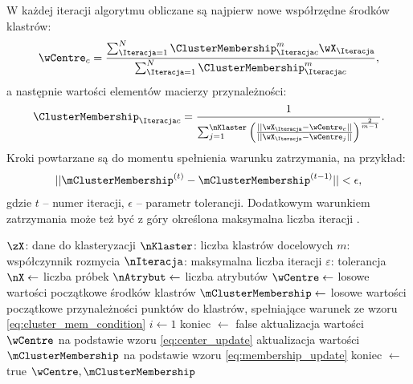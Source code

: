 \documentclass[a4paper,twoside,12pt]{book}
\begin{document}
W każdej iteracji algorytmu obliczane są najpierw nowe współrzędne środków klastrów:
\begin{align}
	\label{eq:center_update}
	\wCentre_{\klaster} = \frac{\sum_{\Iteracja=1}^{N} \ClusterMembership_{\Iteracja\klaster}^{m} \wX_{\Iteracja}}{\sum_{\Iteracja=1}^{N} \ClusterMembership_{\Iteracja\klaster}^{m}},
\end{align}
a następnie wartości elementów macierzy przynależności:
\begin{align}
	\label{eq:membership_update}
	\ClusterMembership_{\Iteracja\klaster} = \frac{1}{\sum_{j=1}^{\nKlaster}\left( \frac{||\wX_{\Iteracja} - \wCentre_{\klaster}||}{||\wX_{\Iteracja} - \wCentre_{j}||} \right)^{\frac{2}{m - 1}}}.
\end{align}
Kroki powtarzane są do momentu spełnienia warunku zatrzymania, na przykład:
\begin{align}
	\label{eq:fcm_stop_contidion}
	||\mClusterMembership^{(t)} - \mClusterMembership^{(t-1)}|| < \epsilon,
\end{align}
%
gdzie $t$ -- numer iteracji, $\epsilon$ -- parametr tolerancji. Dodatkowym warunkiem zatrzymania może też być z góry określona maksymalna liczba iteracji \cite{bib:scikit-fuzzy-cmeans-docs-fcm, bib:skfuzzy-docs-fcm}.

\begin{algorithm}[t]
	\caption{Algorytm rozmytych $c$ średnich}
	\label{alg:fcm}
	\begin{algorithmic}[1]
		\Require $\zX$: dane do klasteryzacji
		\Require $\nKlaster$: liczba klastrów docelowych
		\Require $m$: współczynnik rozmycia 
		\Require $\nIteracja$: maksymalna liczba iteracji
		\Require $\varepsilon$: tolerancja
		\State $\nX \gets $ liczba próbek
		\State $\nAtrybut \gets $ liczba atrybutów  
		\State $\wCentre \gets $ losowe wartości początkowe środków klastrów
		\State $\mClusterMembership \gets $ losowe wartości początkowe przynależności punktów do klastrów, spełniające warunek ze wzoru \ref{eq:cluster_mem_condition}
		\State $i\gets 1$
		\State koniec $\gets$ false
		\State aktualizacja wartości $\wCentre$ na podstawie wzoru \eqref{eq:center_update}
		\State aktualizacja wartości $\mClusterMembership$ na podstawie wzoru \eqref{eq:membership_update}
		\State  koniec $\gets$ true
		\EndIf
		\EndWhile
		\State \Return $\wCentre, \mClusterMembership$
		\EndProcedure
	\end{algorithmic}
\end{algorithm}
\end{document}
